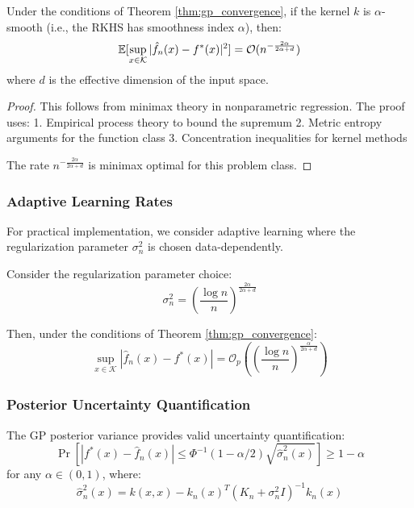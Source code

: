 \begin{theorem}
\label{thm:gp_rate}
Under the conditions of Theorem \ref{thm:gp_convergence}, if the kernel $k$ is $\alpha$-smooth (i.e., the RKHS has smoothness index $\alpha$), then:
$$\operatorname{\mathbb{E}}[\sup_{x \in \mathcal{K}} |\hat{f}_n(x) - f^*(x)|^2] = \mathcal{O}(n^{-\frac{2\alpha}{2\alpha + d}})$$
where $d$ is the effective dimension of the input space.
\end{theorem}

\begin{proof}
This follows from minimax theory in nonparametric regression. The proof uses:
1. Empirical process theory to bound the supremum
2. Metric entropy arguments for the function class
3. Concentration inequalities for kernel methods

The rate $n^{-\frac{2\alpha}{2\alpha + d}}$ is minimax optimal for this problem class.
\end{proof}

\subsubsection{Adaptive Learning Rates}

For practical implementation, we consider adaptive learning where the regularization parameter $\sigma_n^2$ is chosen data-dependently.

\begin{theorem}
\label{thm:adaptive_gp}
Consider the regularization parameter choice:
$$\sigma_n^2 = \left(\frac{\log n}{n}\right)^{\frac{2\alpha}{2\alpha + d}}$$

Then, under the conditions of Theorem \ref{thm:gp_convergence}:
$$\sup_{x \in \mathcal{K}} |\hat{f}_n(x) - f^*(x)| = \mathcal{O}_p\left(\left(\frac{\log n}{n}\right)^{\frac{\alpha}{2\alpha + d}}\right)$$
\end{theorem}

\subsubsection{Posterior Uncertainty Quantification}

\begin{theorem}
\label{thm:gp_uncertainty}
The GP posterior variance provides valid uncertainty quantification:
$$\Pr\left[|f^*(x) - \hat{f}_n(x)| \leq \Phi^{-1}(1-\alpha/2) \sqrt{\hat{\sigma}_n^2(x)}\right] \geq 1 - \alpha$$
for any $\alpha \in (0, 1)$, where:
$$\hat{\sigma}_n^2(x) = k(x,x) - k_n(x)^T (K_n + \sigma_n^2 I)^{-1} k_n(x)$$
\end{theorem}

